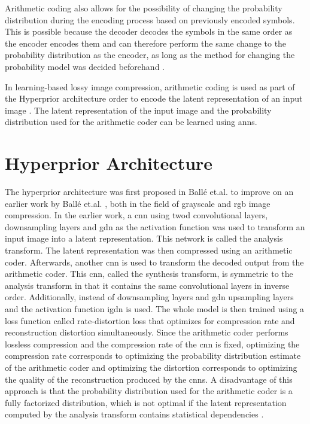Arithmetic coding also allows for the possibility of changing the probability distribution during the encoding process based on previously encoded symbols. This is possible because the decoder decodes the symbols in the same order as the encoder encodes them and can therefore perform the same change to the probability distribution as the encoder, as long as the method for changing the probability model was decided beforehand \citep{said_introduction_2023}.

In learning-based lossy image compression, arithmetic coding is used as part of the Hyperprior architecture order to encode the latent representation of an input image \citep{balle_end--end_2017,minnen_joint_2018,balle_variational_2018}. The latent representation of the input image and the probability distribution used for the arithmetic coder can be learned using \acp{ann}.

\section{Hyperprior Architecture}
The hyperprior architecture was first proposed in Ballé et.al. \citep{balle_variational_2018} to improve on an earlier work by Ballé et.al. \citep{balle_end--end_2017}, both in the field of grayscale and \ac{rgb} image compression. In the earlier work, a \ac{cnn} using \ac{twod} convolutional layers, downsampling layers and \ac{gdn} as the activation function was used to transform an input image into a latent representation. This network is called the analysis transform. The latent representation was then compressed using an arithmetic coder. Afterwards, another \ac{cnn} is used to transform the decoded output from the arithmetic coder. This \ac{cnn}, called the synthesis transform, is symmetric to the analysis transform in that it contains the same convolutional layers in inverse order. Additionally, instead of downsampling layers and \ac{gdn} upsampling layers and the activation function \ac{igdn} is used. The whole model is then trained using a loss function called rate-distortion loss that optimizes for compression rate and reconstruction distortion simultaneously. Since the arithmetic coder performs lossless compression and the compression rate of the \ac{cnn} is fixed, optimizing the compression rate corresponds to optimizing the probability distribution estimate of the arithmetic coder and optimizing the distortion corresponds to optimizing the quality of the reconstruction produced by the \acp{cnn}. A disadvantage of this approach is that the probability distribution used for the arithmetic coder is a fully factorized distribution, which is not optimal if the latent representation computed by the analysis transform contains statistical dependencies \citep{balle_variational_2018}.

